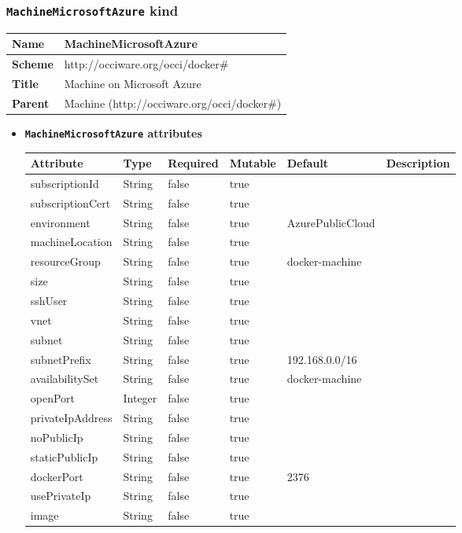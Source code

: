 \subsubsection{\texttt{MachineMicrosoftAzure} kind}
\begin{center}
\begin{tabular}{|l|l|}
  \hline
  \textbf{Name} & MachineMicrosoftAzure \\
  \hline  
  \textbf{Scheme} & http://occiware.org/occi/docker\# \\
  \hline
  \textbf{Title} & Machine on Microsoft Azure \\
  \hline
  \textbf{Parent} & Machine (http://occiware.org/occi/docker\#) \\
  \hline
\end{tabular}
\end{center}
\begin{itemize}
\item \textbf{\texttt{MachineMicrosoftAzure} attributes}

\begin{tabularx}{\textwidth}{|l|l|p{1.4cm}|p{1.3cm}|l|X|}
  \hline
  \textbf{Attribute} & \textbf{Type} & \textbf{Required} & \textbf{Mutable} & \textbf{Default} & \textbf{Description} \\
  \hline  
  subscriptionId & String & false & true &  &  \\
  \hline
  subscriptionCert & String & false & true &  &  \\
  \hline
  environment & String & false & true & AzurePublicCloud &  \\
  \hline
  machineLocation & String & false & true &  &  \\
  \hline
  resourceGroup & String & false & true & docker-machine &  \\
  \hline
  size & String & false & true &  &  \\
  \hline
  sshUser & String & false & true &  &  \\
  \hline
  vnet & String & false & true &  &  \\
  \hline
  subnet & String & false & true &  &  \\
  \hline
  subnetPrefix & String & false & true & 192.168.0.0/16 &  \\
  \hline
  availabilitySet & String & false & true & docker-machine &  \\
  \hline
  openPort & Integer & false & true &  &  \\
  \hline
  privateIpAddress & String & false & true &  &  \\
  \hline
  noPublicIp & String & false & true &  &  \\
  \hline
  staticPublicIp & String & false & true &  &  \\
  \hline
  dockerPort & String & false & true & 2376 &  \\
  \hline
  usePrivateIp & String & false & true &  &  \\
  \hline
  image & String & false & true &  &  \\
  \hline
\end{tabularx}
\end{itemize}



